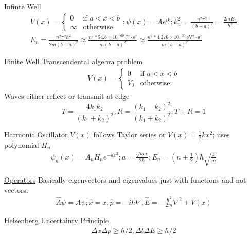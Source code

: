 \documentclass[8pt]{extarticle}
\newcommand{\e}[1]{e^{#1}}
\newcommand{\E}[1]{\times 10^{#1}}
\begin{document}
    \underline{Infinte Well}
    \begin{gather*}
        V(x) = \begin{cases}
            0 & \text{if } a < x < b \\
            \infty & \text{otherwise}
        \end{cases}; \psi(x) = Ae^{ik};
        k_n^2 = \frac{n^2\pi^2}{(b - a)^2} = \frac{2mE_n}{\hbar^2}\\
        E_n = \frac{n^2\pi^2\hbar^2}{2m(b - a)^2} \approx \frac{n^2 * 54.8\E{-69}\,\unit{\joule^2\cdot\second^2}}{m(b - a)^2}
            \approx \frac{n^2 * 4.276\E{-30}\,\unit{\eV^2\cdot\second^2}}{m(b - a)^2}
    \end{gather*}

    \underline{Finite Well} Transcendental algebra problem
    \begin{gather*}
        V(x) = \begin{cases}
            0 & \text{if } a < x < b \\
            V_0 & \text{otherwise}
        \end{cases}
    \end{gather*}
    Waves either reflect or transmit at edge
    \begin{equation*}
        T = \frac{4k_1k_2}{(k_1 + k_2)^2}; 
        R = \frac{(k_1 - k_2)^2}{(k_1 + k_2)^2}; 
        T + R = 1
    \end{equation*}

    \underline{Harmonic Oscillator}
    $V(x)$ follows Taylor series or $V(x) = \frac{1}{2}kx^2$; uses polynomial $H_n$
    \begin{gather*}
        \psi_n(x) = A_n H_n \e{-ax^2}; a = \frac{\sqrt{km}}{2\hbar}; E_n = \left( n + \frac{1}{2} \right) \hbar \sqrt{\frac{k}{m}}
    \end{gather*}

    \underline{Operators} Basically eigenvectors and eigenvalues just with functions and not vectors.
    \begin{gather*}
        \hat{A}\psi = A\psi; 
        \hat{x} = x;
        \hat{p} = -i\hbar\nabla;
        \hat{E} = -\frac{\hbar^2}{2m}\nabla^2 + V(x)
    \end{gather*}

    \underline{Heisenberg Uncertainty Principle}
        \begin{gather*}
            \Delta x \Delta p \geq \hbar / 2;
            \Delta t \Delta E \geq \hbar / 2
        \end{gather*}
    
\end{document}
